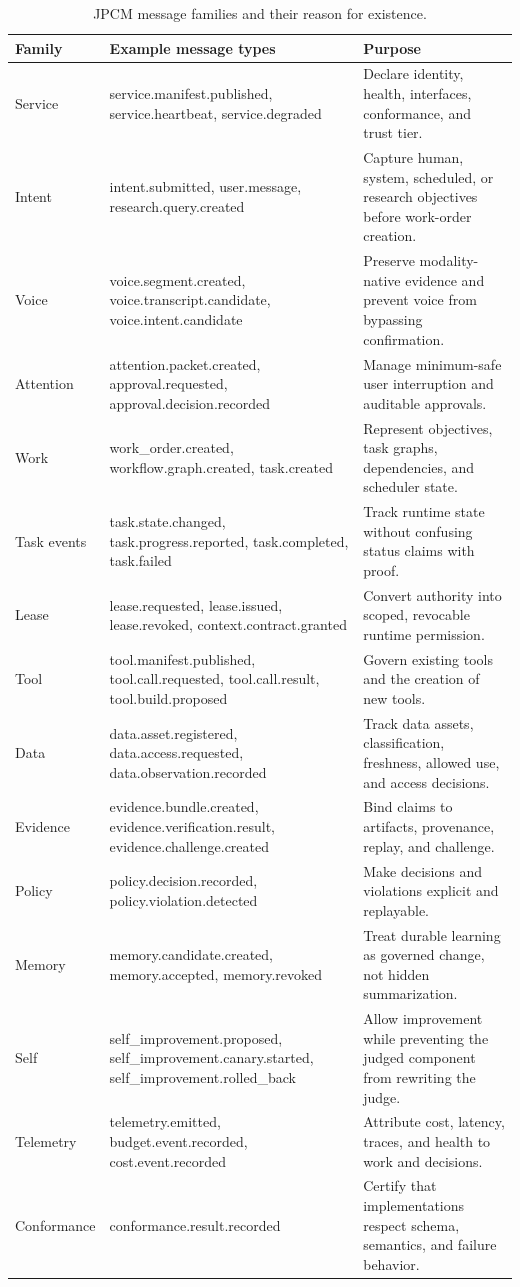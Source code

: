 \documentclass[journal,onecolumn]{IEEEtran}
\begin{document}
\begin{longtable}{p{}p{}p{}}
\caption{JPCM message families and their reason for existence.}\\
\toprule
Family & Example message types & Purpose\\
\midrule
Service & service.manifest.published, service.heartbeat, service.degraded & Declare identity, health, interfaces, conformance, and trust tier.\\
Intent & intent.submitted, user.message, research.query.created & Capture human, system, scheduled, or research objectives before work-order creation.\\
Voice & voice.segment.created, voice.transcript.candidate, voice.intent.candidate & Preserve modality-native evidence and prevent voice from bypassing confirmation.\\
Attention & attention.packet.created, approval.requested, approval.decision.recorded & Manage minimum-safe user interruption and auditable approvals.\\
Work & work\_order.created, workflow.graph.created, task.created & Represent objectives, task graphs, dependencies, and scheduler state.\\
Task events & task.state.changed, task.progress.reported, task.completed, task.failed & Track runtime state without confusing status claims with proof.\\
Lease & lease.requested, lease.issued, lease.revoked, context.contract.granted & Convert authority into scoped, revocable runtime permission.\\
Tool & tool.manifest.published, tool.call.requested, tool.call.result, tool.build.proposed & Govern existing tools and the creation of new tools.\\
Data & data.asset.registered, data.access.requested, data.observation.recorded & Track data assets, classification, freshness, allowed use, and access decisions.\\
Evidence & evidence.bundle.created, evidence.verification.result, evidence.challenge.created & Bind claims to artifacts, provenance, replay, and challenge.\\
Policy & policy.decision.recorded, policy.violation.detected & Make decisions and violations explicit and replayable.\\
Memory & memory.candidate.created, memory.accepted, memory.revoked & Treat durable learning as governed change, not hidden summarization.\\
Self & self\_improvement.proposed, self\_improvement.canary.started, self\_improvement.rolled\_back & Allow improvement while preventing the judged component from rewriting the judge.\\
Telemetry & telemetry.emitted, budget.event.recorded, cost.event.recorded & Attribute cost, latency, traces, and health to work and decisions.\\
Conformance & conformance.result.recorded & Certify that implementations respect schema, semantics, and failure behavior.\\
\bottomrule
\end{longtable}
\end{document}
